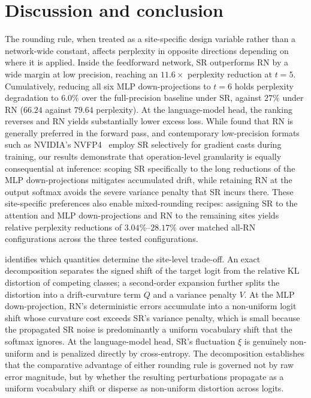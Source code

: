 \section{Discussion and conclusion}
\label{sec:conclusion}

The rounding rule, when treated as a site-specific design variable rather than a
network-wide constant, affects perplexity in opposite directions depending on
where it is applied.
Inside the feedforward network, SR outperforms RN by a wide margin at low
precision, reaching an $11.6\times$ perplexity reduction at $t=5$.
Cumulatively, reducing all six MLP down-projections to $t=6$ holds perplexity
degradation to $6.0\%$ over the full-precision baseline under SR, against $27\%$
under RN ($66.24$ against $79.64$ perplexity).
At the language-model head, the ranking reverses and RN yields substantially
lower excess loss.
While \citet{chmiel2023accurate} found that RN is generally preferred in the
forward pass, and contemporary low-precision formats such as NVIDIA's
NVFP4~\citep{nvidia2025nvfp4} employ SR selectively for gradient casts during
training, our results demonstrate that operation-level granularity is equally
consequential at inference: scoping SR specifically to the long reductions of the
MLP down-projections mitigates accumulated drift, while retaining RN at the
output softmax avoids the severe variance penalty that SR incurs there.
These site-specific preferences also enable mixed-rounding recipes: assigning SR
to the attention and MLP down-projections and RN to the remaining sites yields relative
perplexity reductions of $3.04\%$--$28.17\%$ over matched all-RN configurations
across the three tested configurations.

 identifies which quantities determine the site-level
trade-off.
An exact decomposition separates the signed shift of the target logit from the
relative KL distortion of competing classes; a second-order expansion further
splits the distortion into a drift-curvature term $Q$ and a variance penalty
$V$.
At the MLP down-projection, RN's deterministic errors accumulate into a
non-uniform logit shift whose curvature cost exceeds SR's variance penalty,
which is small because the propagated SR noise is predominantly a uniform
vocabulary shift that the softmax ignores.
At the language-model head, SR's fluctuation $\xi$ is genuinely non-uniform and is
penalized directly by cross-entropy.
The decomposition establishes that the comparative advantage of
either rounding rule is governed not by raw error magnitude, but by whether the
resulting perturbations propagate as a uniform vocabulary shift or disperse as
non-uniform distortion across logits.

